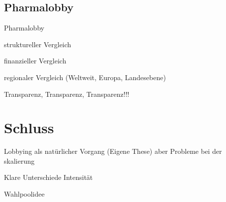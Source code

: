 \subsection{Pharmalobby}
\begin{itemize*}
	\item Pharmalobby \cite{BeckLobbyGesundwe}
	\item struktureller Vergleich
	\item finanzieller Vergleich
	\item regionaler Vergleich (Weltweit, Europa, Landesebene)
	\item Transparenz, Transparenz, Transparenz!!!
\end{itemize*}

\section{Schluss}
\begin{itemize*}
\item Lobbying als natürlicher Vorgang (Eigene These) aber Probleme
bei der skalierung
\item Klare Unterschiede Intensität
\item Wahlpoolidee
\end{itemize*}

\newpage



\listoftodos


